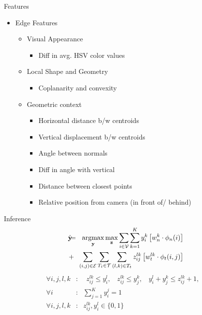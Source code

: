 \documentclass{beamer}
\DeclareMathOperator*{\argmax}{argmax}
\newcommand{\y}{{\mathbf y}}     %
\newcommand{\ysc}[2]{{y_{#1}^{#2}}}    %
\newcommand{\zsc}[2]{{z_{#1}^{#2}}}    %
\newcommand{\fn}[1]{{\phi_n(#1)}}      %
\newcommand{\fe}[3]{{\phi_{#1}(#2,#3)}}%
\newcommand{\wn}[1]{{w_n^{#1}}}        %
\newcommand{\we}[3]{{w_{#1}^{#2#3}}}   %
\begin{document}
\begin{frame}{Features}

\begin{itemize}
\item Edge Features
\begin{itemize}
\item Visual Appearance
	\begin{itemize}
	\item Diff in avg. HSV color values
	\end{itemize}
	\item Local Shape and Geometry
	\begin{itemize}
	\item Coplanarity and convexity
	\end{itemize}
	\item Geometric context
	\begin{itemize}
	\item Horizontal distance b/w centroids
	\item Vertical displacement b/w centroids
	\item Angle between normals
	\item Diff in angle with vertical
	\item Distance between closest points
	\item Relative position from camera (in front of/ behind) 
	\end{itemize}
\end{itemize}
\end{itemize}

\end{frame}

\begin{frame}{Inference}
 \begin{eqnarray*}
\hat{\y}\!\!\!&=&\!\!\!\argmax_{\y}\max_{\mathbf z} \sum_{i \in \mathcal{V}} \sum_{k=1}^{K} \ysc{i}{k} \left[\wn{k} \cdot \fn{i} \right] \\
&+&  \!\!\!\sum_{(i,j)\in \mathcal{E}}  \sum_{T_t \in {\cal T}} \sum_{(l,k)\in T_t} \zsc{ij}{lk} \left[\we{t}{l}{k} \cdot \fe{t}{i}{j}\right] 
 \label{eq:relaxobj}\\
\end{eqnarray*}
 \begin{eqnarray*}
  \forall i,j,l,k &:& \:\: \zsc{ij}{lk}\le \ysc{i}{l}, \:\:\:\:
\zsc{ij}{lk}\le \ysc{j}{k},\:\:\:\:
\ysc{i}{l} + \ysc{j}{k} \le \zsc{ij}{lk}+1,\:\:\:\: \\
\forall i &:& \sum_{j=1}^{K} y_i^j = 1\\
\forall i,j,l,k &:& \zsc{ij}{lk},\ysc{i}{l} \in \{ 0,1 \} \label{eq:relaxconst}
\end{eqnarray*}
\end{frame}
\end{document}
